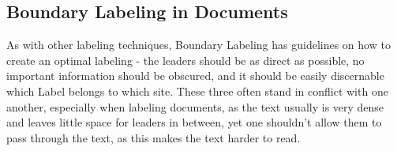 \documentclass[11pt,a4paper]{article}
\begin{document}

\subsection{Boundary Labeling in Documents}
As with other labeling techniques, Boundary Labeling has guidelines on how to create an optimal labeling - the leaders should be as direct as possible, no important information should be obscured, and it should be easily discernable which Label belongs to which site. These three often stand in conflict with one another, especially when labeling documents, as the text usually is very dense and leaves little space for leaders in between, yet one shouldn't allow them to pass through the text, as this makes the text harder to read.







\end{document}
